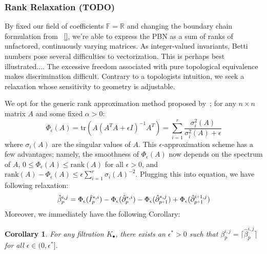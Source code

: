 \documentclass[10pt]{article}
\newcommand{\+}{%
	\raisebox{0.18ex}{\scaleobj{0.55}{+}}
}
\newtheorem{corollary}{Corollary}
\begin{document}


\subsubsection*{Rank Relaxation (TODO)}
By fixed our field of coefficients $\mathbb{F} = \mathbb{R}$ and changing the boundary chain formulation from ~\eqref{}, we're able to express the PBN as a sum of ranks of unfactored, continuously varying matrices. As integer-valued invariants, Betti numbers pose several difficulties to vectorization. This is perhaps best illustrated.... The excessive freedom associated with pure topological equivalence makes discrimination difficult. Contrary to a topologists intuition, we seek a relaxation whose sensitivity to geometry is adjustable. 

We opt for the generic rank approximation method proposed by~\cite{}; for any $n \times n$ matrix $A$ and some fixed $\alpha > 0$:
$$ \Phi_\epsilon(A) = \mathrm{tr}\left(A(A^T A + \epsilon I)^{-1} A^T \right ) = \sum\limits_{i=1}^r \frac{\sigma_i^2(A)}{\sigma_i^2(A) + \epsilon} $$
where $\sigma_i(A)$ are the singular values of $A$. This $\epsilon$-approximation scheme has a few advantages; namely, the smoothness of $\Phi_\epsilon(A)$ now depends on the spectrum of $A$, $0 \leq \Phi_\epsilon(A) \leq \mathrm{rank}(A)$ for all $\epsilon > 0$, and $\mathrm{rank}(A) - \Phi_\epsilon(A) \leq \epsilon \sum_{i=1}^r \sigma_i(A)^{-2}$. 
Plugging this into equation, we have following relaxation:
\begin{equation}\label{eq:final_relaxation}
\hat{\beta}_p^{i,j} =  \Phi_\epsilon(\hat{I}_p^{\ast,i}) -  \Phi_\epsilon(\hat{\partial}_p^{\ast,i}) -  \Phi_\epsilon(\hat{\partial}_{p\+1 }^{\ast,j}) + \Phi_\epsilon(\hat{\partial}_{p\+1}^{i \+ 1, j} )
\end{equation}
Moreover, we immediately have the following Corollary:
\begin{corollary}
	For any filtration $K_\bullet$, there exists an $\epsilon^\ast > 0$ such that $\beta_p^{i,j} = \lceil \hat{\beta}_p^{i,j} \rceil$ for all $\epsilon \in (0, \epsilon^\ast]$. 
\end{corollary}
\end{document}

